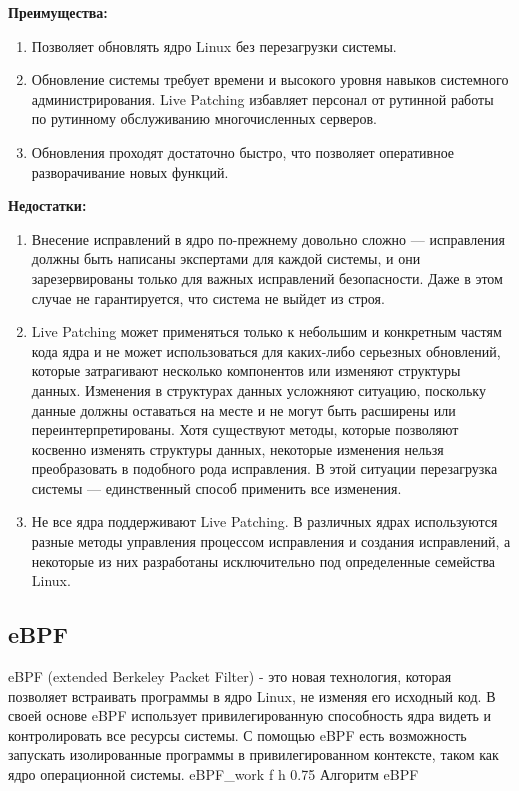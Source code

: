 \textbf{Преимущества:}

\begin{enumerate}
    \item Позволяет обновлять ядро Linux без перезагрузки системы.
    \item Обновление системы требует времени и высокого уровня навыков системного администрирования.
    Live Patching избавляет персонал от рутинной работы по рутинному обслуживанию многочисленных серверов.
    \item Обновления проходят достаточно быстро, что позволяет оперативное разворачивание новых функций.
\end{enumerate}

\textbf{Недостатки:}

\begin{enumerate}
    \item Внесение исправлений в ядро по-прежнему довольно сложно — исправления должны быть написаны экспертами для каждой системы,
    и они зарезервированы только для важных исправлений безопасности.
    Даже в этом случае не гарантируется, что система не выйдет из строя.
    \item Live Patching может применяться только к небольшим и конкретным частям кода ядра и не может использоваться для каких-либо серьезных обновлений,
    которые затрагивают несколько компонентов или изменяют структуры данных.
    \vspace{0.5cm}
    Изменения в структурах данных усложняют ситуацию, поскольку данные должны оставаться на месте и не могут быть расширены или переинтерпретированы.
    Хотя существуют методы, которые позволяют косвенно изменять структуры данных, некоторые изменения нельзя преобразовать в подобного рода исправления.
    В этой ситуации перезагрузка системы — единственный способ применить все изменения.
    \item Не все ядра поддерживают Live Patching.
    В различных ядрах используются разные методы управления процессом исправления и создания исправлений,
    а некоторые из них разработаны исключительно под определенные семейства Linux.\cite{infosec}
\end{enumerate}

\subsection{eBPF}\label{subsec:ebpf}

eBPF (extended Berkeley Packet Filter) - это новая технология, которая позволяет встраивать программы в ядро Linux, не изменяя его исходный код.
В своей основе eBPF использует привилегированную способность ядра видеть и контролировать все ресурсы системы.
С помощью eBPF есть возможность запускать изолированные программы в привилегированном контексте, таком как ядро операционной системы.
{eBPF_work} %
{f}
{h}
{0.75\textwidth} %
{Алгоритм eBPF} %
\vspace{5mm}\\

